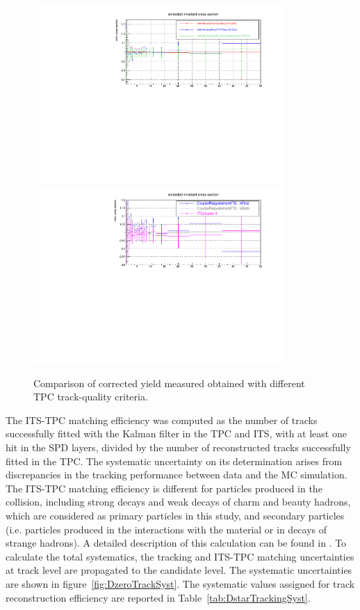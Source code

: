 \begin{figure}[!b]
\begin{center}
 \includegraphics[width=0.85\textwidth]{figures/Dstar/pp13TeV/corrected-yield-ratio-tracking-Dstar-D0-single-track.pdf}
 \includegraphics[width=0.85\textwidth]{figures/Dstar/pp13TeV/tracking-soft-pion-ratio-cross-section.pdf}
\caption{Comparison of \Dstar corrected yield measured obtained with different TPC track-quality criteria.}
\label{fig:TrackVariations}
\end{center}
\end{figure}

The ITS-TPC matching efficiency was computed as the number of tracks successfully fitted with the Kalman filter in the TPC and ITS, with at least one hit in the SPD layers, divided by the number of reconstructed tracks successfully fitted in the TPC. The systematic uncertainty on its determination arises from discrepancies in the tracking performance between data and the MC simulation. The ITS-TPC matching efficiency is different for particles produced in the collision, including strong decays and weak decays of charm and beauty hadrons, which are considered as primary particles in this study, and secondary particles (i.e. particles produced in the interactions with the material or in decays of strange hadrons). A detailed description of this calculation can be found in \cite{Ana:537}. To calculate the total systematics, the tracking and ITS-TPC matching uncertainties at track level are propagated to the candidate level. The systematic uncertainties are shown in figure~\ref{fig:DzeroTrackSyst}. The systematic values assigned for track reconstruction efficiency are reported in Table~\ref{tab:DstarTrackingSyst}.

